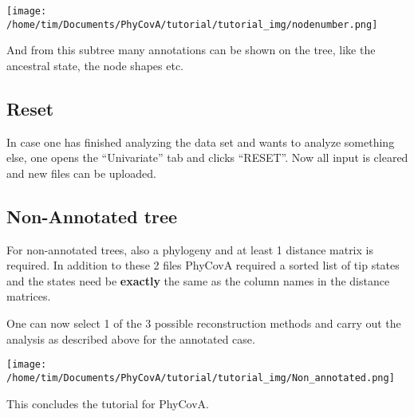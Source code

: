 \documentclass[
]{article}
\begin{document}
\texttt{[image: /home/tim/Documents/PhyCovA/tutorial/tutorial\_img/nodenumber.png]}

And from this subtree many annotations can be shown on the tree, like
the ancestral state, the node shapes etc.

\hypertarget{reset}{%
\subsection{Reset}\label{reset}}

In case one has finished analyzing the data set and wants to analyze
something else, one opens the ``Univariate'' tab and clicks ``RESET''.
Now all input is cleared and new files can be uploaded.

\hypertarget{non-annotated-tree}{%
\subsection{Non-Annotated tree}\label{non-annotated-tree}}

For non-annotated trees, also a phylogeny and at least 1 distance matrix
is required. In addition to these 2 files PhyCovA required a sorted list
of tip states and the states need be \textbf{exactly} the same as the
column names in the distance matrices.

One can now select 1 of the 3 possible reconstruction methods and carry
out the analysis as described above for the annotated case.

\texttt{[image: /home/tim/Documents/PhyCovA/tutorial/tutorial\_img/Non\_annotated.png]}

This concludes the tutorial for PhyCovA.
\end{document}
